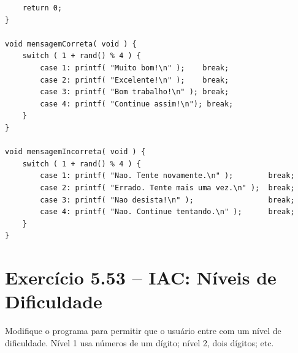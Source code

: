 \documentclass[12pt,a4paper]{article}
\begin{document}
\begin{respostabox}
\begin{lstlisting}
    return 0;
}

void mensagemCorreta( void ) {
    switch ( 1 + rand() % 4 ) {
        case 1: printf( "Muito bom!\n" );    break;
        case 2: printf( "Excelente!\n" );    break;
        case 3: printf( "Bom trabalho!\n" ); break;
        case 4: printf( "Continue assim!\n"); break;
    }
}

void mensagemIncorreta( void ) {
    switch ( 1 + rand() % 4 ) {
        case 1: printf( "Nao. Tente novamente.\n" );        break;
        case 2: printf( "Errado. Tente mais uma vez.\n" );  break;
        case 3: printf( "Nao desista!\n" );                 break;
        case 4: printf( "Nao. Continue tentando.\n" );      break;
    }
}
\end{lstlisting}
\end{respostabox}

\newpage

\section{Exercício 5.53 -- IAC: Níveis de Dificuldade}

\begin{enunciadoBox}[Enunciado 5.53]
Modifique o programa para permitir que o usuário entre com um nível de dificuldade.
Nível 1 usa números de um dígito; nível 2, dois dígitos; etc.
\end{enunciadoBox}
\end{document}
